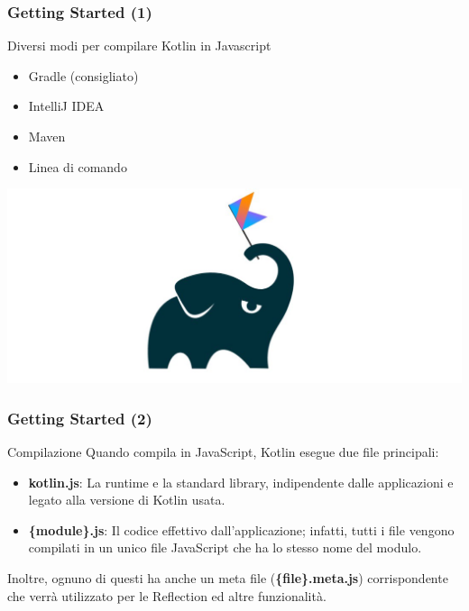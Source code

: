     \begin{frame}
      \frametitle{Getting Started (1)}
      \begin{block}{Diversi modi per compilare Kotlin in Javascript}
        \begin{itemize}
          \item \alert{Gradle} (consigliato)
          \item IntelliJ IDEA
          \item Maven
          \item Linea di comando
        \end{itemize}
      \end{block}
      \begin{center}
        \includegraphics[scale=0.2]{KtGradle}
      \end{center}
    \end{frame}

    \begin{frame}
      \frametitle{Getting Started (2)}
      \begin{block}{Compilazione}
        Quando compila in JavaScript, Kotlin esegue due file principali:
        \begin{itemize}
          \item \textbf{kotlin.js}: La runtime e la standard library, indipendente dalle applicazioni e legato
          alla versione di Kotlin usata.
          \item \textbf{\{module\}.js}: Il codice effettivo dall'applicazione; infatti, tutti i file vengono compilati
          in un unico file JavaScript che ha lo stesso nome del modulo.
        \end{itemize}
        Inoltre, ognuno di questi ha anche un meta file (\textbf{\{file\}.meta.js}) corrispondente che verrà
        utilizzato per le Reflection ed altre funzionalità.
      \end{block}
    \end{frame}

